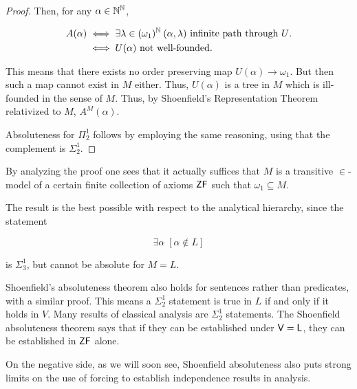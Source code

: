 \begin{proof}
Then, for any $\alpha \in \mathbb{N}^{\mathbb{N}}$,

\begin{align*}
	A(\alpha)     & \iff    \exists \lambda \in (\omega_1)^{\mathbb{N}} \: (\alpha,\lambda) \text{ infinite path through $U$}. \\
     & \iff    U(\alpha) \text{ not well-founded}. \\
\end{align*}

This means that there exists no order preserving map $U(\alpha) \to \omega_1$. But then such a map cannot exist in $M$ either. Thus, $U(\alpha)$ is a tree in $M$ which is ill-founded in the sense of $M$. Thus, by Shoenfield's Representation Theorem relativized to $M$, $A^M(\alpha)$.

Absoluteness for $\Pi^1_2$ follows by employing the same reasoning, using that the complement is $\Sigma^1_2$.

\end{proof}By analyzing the proof one sees that it actually suffices that $M$ is a transitive $\in$-model of a certain finite collection of axioms $\mathsf{ZF}$ such that $\omega_1 \subseteq M$.

The result is the best possible with respect to the analytical hierarchy, since the statement

\begin{equation}
\exists \alpha \; [\alpha \not\in L]
\end{equation}

is $\Sigma^1_3$, but cannot be absolute for $M = L$.

Shoenfield's absoluteness theorem also holds for sentences rather than predicates, with a similar proof. This means a $\Sigma^1_2$ statement is true in $L$ if and only if it holds in $V$. Many results of classical analysis are $\Sigma^1_2$ statements. The Shoenfield absoluteness theorem says that if they can be established under $\mathsf{V=L}$, they can be established in $\mathsf{ZF}$ alone.

On the negative side, as we will soon see, Shoenfield absoluteness also puts strong limits on the use of forcing to establish independence results in analysis.